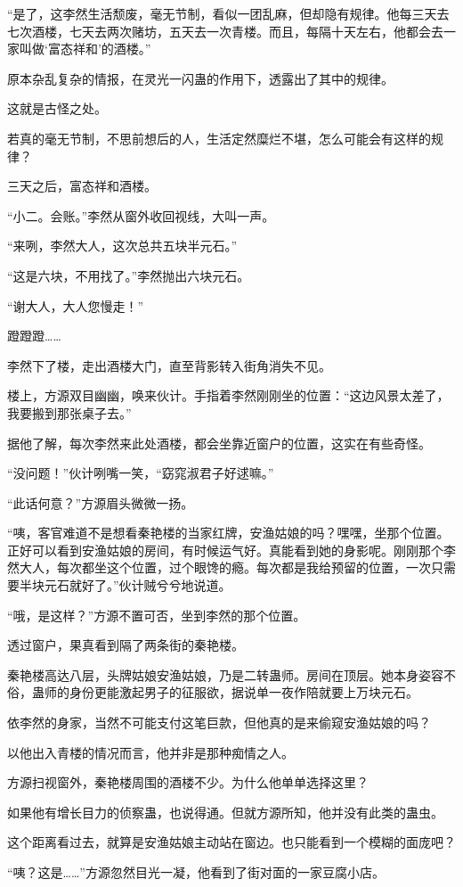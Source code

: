 \begin{this_body}
“是了，这李然生活颓废，毫无节制，看似一团乱麻，但却隐有规律。他每三天去七次酒楼，七天去两次赌坊，五天去一次青楼。而且，每隔十天左右，他都会去一家叫做‘富态祥和’的酒楼。”

原本杂乱复杂的情报，在灵光一闪蛊的作用下，透露出了其中的规律。

这就是古怪之处。

若真的毫无节制，不思前想后的人，生活定然糜烂不堪，怎么可能会有这样的规律？

三天之后，富态祥和酒楼。

“小二。会账。”李然从窗外收回视线，大叫一声。

“来咧，李然大人，这次总共五块半元石。”

“这是六块，不用找了。”李然抛出六块元石。

“谢大人，大人您慢走！”

蹬蹬蹬……

李然下了楼，走出酒楼大门，直至背影转入街角消失不见。

楼上，方源双目幽幽，唤来伙计。手指着李然刚刚坐的位置：“这边风景太差了，我要搬到那张桌子去。”

据他了解，每次李然来此处酒楼，都会坐靠近窗户的位置，这实在有些奇怪。

“没问题！”伙计咧嘴一笑，“窈窕淑君子好逑嘛。”

“此话何意？”方源眉头微微一扬。

“咦，客官难道不是想看秦艳楼的当家红牌，安渔姑娘的吗？嘿嘿，坐那个位置。正好可以看到安渔姑娘的房间，有时候运气好。真能看到她的身影呢。刚刚那个李然大人，每次都坐这个位置，过个眼馋的瘾。每次都是我给预留的位置，一次只需要半块元石就好了。”伙计贼兮兮地说道。

“哦，是这样？”方源不置可否，坐到李然的那个位置。

透过窗户，果真看到隔了两条街的秦艳楼。

秦艳楼高达八层，头牌姑娘安渔姑娘，乃是二转蛊师。房间在顶层。她本身姿容不俗，蛊师的身份更能激起男子的征服欲，据说单一夜作陪就要上万块元石。

依李然的身家，当然不可能支付这笔巨款，但他真的是来偷窥安渔姑娘的吗？

以他出入青楼的情况而言，他并非是那种痴情之人。

方源扫视窗外，秦艳楼周围的酒楼不少。为什么他单单选择这里？

如果他有增长目力的侦察蛊，也说得通。但就方源所知，他并没有此类的蛊虫。

这个距离看过去，就算是安渔姑娘主动站在窗边。也只能看到一个模糊的面庞吧？

“咦？这是……”方源忽然目光一凝，他看到了街对面的一家豆腐小店。


\end{this_body}
